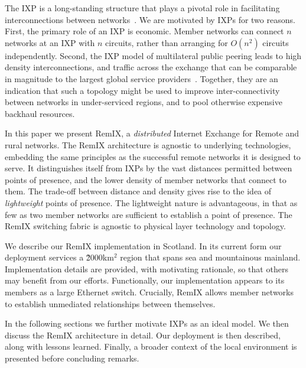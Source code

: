 The \acf{IXP} is a long-standing structure that plays a pivotal role in
facilitating interconnections between networks~\cite{Ager:2012,Chatzis:2013}. We
are motivated by \acp{IXP} for two reasons. First, the primary role of an
\ac{IXP} is economic. Member networks can connect $n$ networks at an IXP with
$n$ circuits, rather than arranging for $O(n^2)$ circuits independently.
Second, the \ac{IXP} model of multilateral public peering leads to high density
interconnections, and traffic across the exchange that can be comparable in
magnitude to the largest global service providers~\cite{Ager:2012}. Together,
they are an indication that such a topology might be used to improve
inter-connectivity between networks in under-serviced regions, and to pool
otherwise expensive backhaul resources.

In this paper we present RemIX, a \emph{distributed} Internet Exchange for
Remote and rural networks. The RemIX architecture is agnostic to underlying
technologies, embedding the same principles as the successful remote networks it
is designed to serve. It distinguishes itself from \acp{IXP} by the vast
distances permitted between points of presence, and the lower density of member
networks that connect to them. The trade-off between distance and density gives
rise to the idea of \emph{lightweight} points of presence. The lightweight
nature is advantageous, in that as few as two member networks are sufficient to
establish a point of presence. The RemIX switching fabric is agnostic to
physical layer technology and topology.

We describe our RemIX implementation in Scotland. In its current form our
deployment services a \~2000km$^2$ region that spans sea and mountainous
mainland. Implementation details are provided, with motivating rationale, so
that others may benefit from our efforts. Functionally, our implementation
appears to its members as a large Ethernet switch. Crucially, RemIX allows
member networks to establish unmediated relationships between themselves.

In the following sections we further motivate \acp{IXP} as an ideal model. We
then discuss the RemIX architecture in detail. Our deployment is then described,
along with lessons learned. Finally, a broader context of the local environment
is presented before concluding remarks.
